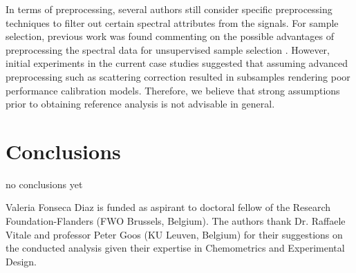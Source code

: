 \documentclass[journal=ancham,manuscript=article]{achemso}
\begin{document}
In terms of preprocessing, several authors still consider specific preprocessing techniques to filter out certain spectral attributes from the signals. For sample selection, previous work was found commenting on the possible advantages of preprocessing the spectral data for unsupervised sample selection \cite{Liu2019}. However, initial experiments in the current case studies suggested that assuming advanced preprocessing such as scattering correction resulted in subsamples rendering poor performance calibration models. Therefore, we believe that strong assumptions prior to obtaining reference analysis is not advisable in general.




\section*{Conclusions}\label{conclusions}
no conclusions yet


\begin{acknowledgement}

Valeria Fonseca Diaz is funded as aspirant to doctoral fellow of
the Research Foundation-Flanders (FWO Brussels, Belgium).
The authors thank Dr. Raffaele Vitale and professor Peter Goos (KU Leuven, Belgium) for their suggestions on the conducted analysis given their expertise in Chemometrics and Experimental Design. 
\end{acknowledgement}





\end{document}
